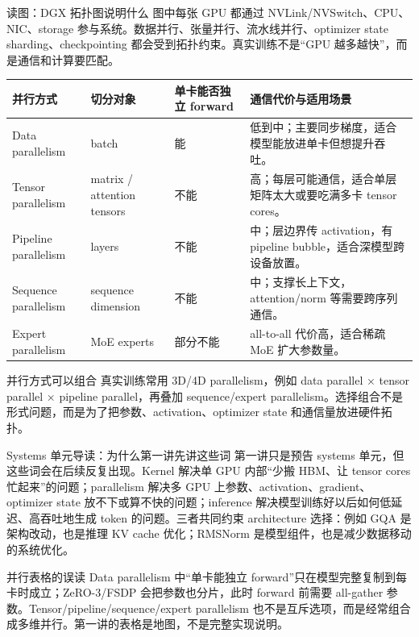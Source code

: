 \documentclass[a4paper]{article}
\begin{document}
\begin{knowledgebox}{读图：DGX 拓扑图说明什么}
图中每张 GPU 都通过 NVLink/NVSwitch、CPU、NIC、storage 参与系统。数据并行、张量并行、流水线并行、optimizer state sharding、checkpointing 都会受到拓扑约束。真实训练不是“GPU 越多越快”，而是通信和计算要匹配。
\end{knowledgebox}

\begin{longtable}{p{}p{}p{}p{}}
\toprule
\textbf{并行方式} & \textbf{切分对象} & \textbf{单卡能否独立 forward} & \textbf{通信代价与适用场景} \\
\midrule
Data parallelism & batch & 能 & 低到中；主要同步梯度，适合模型能放进单卡但想提升吞吐。 \\
Tensor parallelism & matrix / attention tensors & 不能 & 高；每层可能通信，适合单层矩阵太大或要吃满多卡 tensor cores。 \\
Pipeline parallelism & layers & 不能 & 中；层边界传 activation，有 pipeline bubble，适合深模型跨设备放置。 \\
Sequence parallelism & sequence dimension & 不能 & 中；支撑长上下文，attention/norm 等需要跨序列通信。 \\
Expert parallelism & MoE experts & 部分不能 & all-to-all 代价高，适合稀疏 MoE 扩大参数量。 \\
\bottomrule
\end{longtable}

\begin{importantbox}{并行方式可以组合}
真实训练常用 3D/4D parallelism，例如 data parallel × tensor parallel × pipeline parallel，再叠加 sequence/expert parallelism。选择组合不是形式问题，而是为了把参数、activation、optimizer state 和通信量放进硬件拓扑。
\end{importantbox}

\begin{knowledgebox}{Systems 单元导读：为什么第一讲先讲这些词}
第一讲只是预告 systems 单元，但这些词会在后续反复出现。Kernel 解决单 GPU 内部“少搬 HBM、让 tensor cores 忙起来”的问题；parallelism 解决多 GPU 上参数、activation、gradient、optimizer state 放不下或算不快的问题；inference 解决模型训练好以后如何低延迟、高吞吐地生成 token 的问题。三者共同约束 architecture 选择：例如 GQA 是架构改动，也是推理 KV cache 优化；RMSNorm 是模型组件，也是减少数据移动的系统优化。
\end{knowledgebox}

\begin{warningbox}{并行表格的误读}
Data parallelism 中“单卡能独立 forward”只在模型完整复制到每卡时成立；ZeRO-3/FSDP 会把参数也分片，此时 forward 前需要 all-gather 参数。Tensor/pipeline/sequence/expert parallelism 也不是互斥选项，而是经常组合成多维并行。第一讲的表格是地图，不是完整实现说明。
\end{warningbox}
\end{document}

